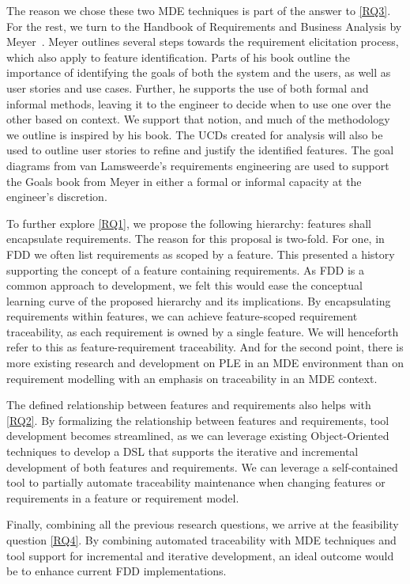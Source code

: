The reason we chose these two \gls{MDE} techniques is part of the answer to \ref{RQ3}. For the rest, we turn to the Handbook of Requirements and Business Analysis by Meyer~\cite{meyer2022handbook}. Meyer outlines several steps towards the requirement elicitation process, which also apply to feature identification. Parts of his book outline the importance of identifying the goals of both the system and the users, as well as user stories and use cases. Further, he supports the use of both formal and informal methods, leaving it to the engineer to decide when to use one over the other based on context. We support that notion, and much of the methodology we outline is inspired by his book. The \gls{UCD}s created for analysis will also be used to outline user stories to refine and justify the identified features. The goal diagrams from van Lamsweerde's requirements engineering are used to support the Goals book from Meyer in either a formal or informal capacity at the engineer's discretion.

To further explore \ref{RQ1}, we propose the following hierarchy: features shall encapsulate requirements. The reason for this proposal is two-fold. For one, in \gls{FDD} we often list requirements as scoped by a feature. This presented a history supporting the concept of a feature containing requirements. As \gls{FDD} is a common approach to development, we felt this would ease the conceptual learning curve of the proposed hierarchy and its implications. By encapsulating requirements within features, we can achieve feature-scoped requirement traceability, as each requirement is owned by a single feature. We will henceforth refer to this as feature-requirement traceability. And for the second point, there is more existing research and development on \gls{PLE} in an \gls{MDE} environment than on requirement modelling with an emphasis on traceability in an \gls{MDE} context.

The defined relationship between features and requirements also helps with  \ref{RQ2}. By formalizing the relationship between features and requirements, tool development becomes streamlined, as we can leverage existing Object-Oriented techniques to develop a \gls{DSL} that supports the iterative and incremental development of both features and requirements. We can leverage a self-contained tool to partially automate traceability maintenance when changing features or requirements in a feature or requirement model.

Finally, combining all the previous research questions, we arrive at the feasibility question \ref{RQ4}. By combining automated traceability with \gls{MDE} techniques and tool support for incremental and iterative development, an ideal outcome would be to enhance current \gls{FDD} implementations. 

